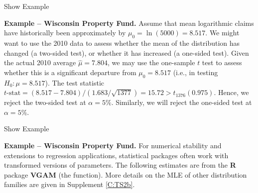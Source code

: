 \documentclass[]{book}
\theoremstyle{definition}
\theoremstyle{definition}
\theoremstyle{definition}
\theoremstyle{remark}
\begin{document}
Show Example

\hypertarget{EXM:S1:TST1}{}
\textbf{Example -- Wisconsin Property Fund.} Assume that mean
logarithmic claims have historically been approximately by
\(\mu_0 = \ln(5000)= 8.517\). We might want to use the 2010 data to
assess whether the mean of the distribution has changed (a two-sided
test), or whether it has increased (a one-sided test). Given the actual
2010 average \(\hat{\mu} =7.804\), we may use the one-sample \(t\) test
to assess whether this is a significant departure from \(\mu_0 = 8.517\)
(i.e., in testing \(H_0:\mu=8.517\)). The test statistic
\(t\text{-stat}=(8.517-7.804)/(1.683/\sqrt{1377}) = 15.72>t_{1376}\left(0.975\right)\).
Hence, we reject the two-sided test at \(\alpha=5\%\). Similarly, we
will reject the one-sided test at \(\alpha=5\%\).

Show Example

\hypertarget{EXM:S1:TST2}{}
\textbf{Example -- Wisconsin Property Fund.} For numerical stability and
extensions to regression applications, statistical packages often work
with transformed versions of parameters. The following estimates are
from the \textbf{R} package \textbf{VGAM} (the function). More details
on the MLE of other distribution families are given in Supplement
\ref{C:TS2b}.
\end{document}
